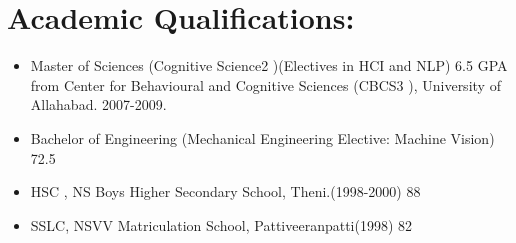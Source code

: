 \section{Academic Qualifications:}
	\begin{itemize}
		\item Master of Sciences (Cognitive Science2 )(Electives in HCI and NLP) 6.5 GPA from Center for Behavioural and Cognitive Sciences (CBCS3 ), University of Allahabad. 2007-2009.
		\item Bachelor of Engineering (Mechanical Engineering Elective: Machine Vision) 72.5%
		\item HSC , NS Boys Higher Secondary School, Theni.(1998-2000) 88%
		\item SSLC, NSVV Matriculation School, Pattiveeranpatti(1998) 82 %
		
	\end{itemize}
	 
	 
	
	